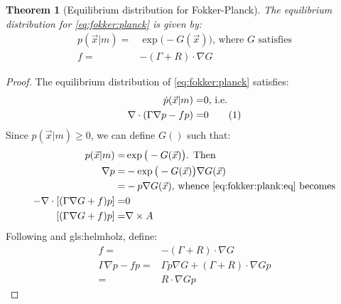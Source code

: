 \documentclass[]{article}
\newcommand\numberthis{\addtocounter{equation}{1}\tag{\theequation}}
\newtheorem{thm}{Theorem}
\begin{document}
\begin{thm}[Equilibrium distribution for Fokker-Planck]
	The equilibrium distribution for \eqref{eq:fokker:planck} is given by:
	\begin{align*}
		p(\vec{x}\vert m) =& \exp \big(-G(\vec{x})\big) \text{, where $G$ satisfies}\\
		f =& -(\Gamma + R) \cdot \nabla G
	\end{align*}
	
\end{thm}
\begin{proof}
The equilibrium distribution of \eqref{eq:fokker:planck} satisfies:
	\begin{align*}
		\dot{p}(\vec{x}\vert m) =&0 \text{, i.e.}\\
		\nabla \cdot (\Gamma \nabla p -f p)=&0 \numberthis \label{eq:fokker:plank:eq}
	\end{align*}
	Since $	p(\vec{x}\vert m) \ge 0$, we can define $G()$ such that:
	\begin{align*}
		p(\vec{x}\vert m) =& \exp \big(-G(\vec{x})\big) \text{. Then}\\
		\nabla p =& - \exp \big(-G(\vec{x})\big) \nabla G(\vec{x})\\
		=& - p \nabla G(\vec{x}) \text{, whence \eqref{eq:fokker:plank:eq} becomes}\\
		-\nabla \cdot [(\Gamma \nabla G +f)p]=&0\\
		 [(\Gamma \nabla G +f)p] =& \nabla \times A
	\end{align*}
	Following \cite[(2.3)]{friston_life_2013} and \gls{gls:helmholz}, define:
	\begin{align*}
		f =& -(\Gamma + R) \cdot \nabla G\\
		\Gamma \nabla p - f p =& \Gamma p \nabla G + (\Gamma + R) \cdot \nabla G p\\
		=& R \cdot \nabla G p
	\end{align*}
\end{proof}
\end{document}
